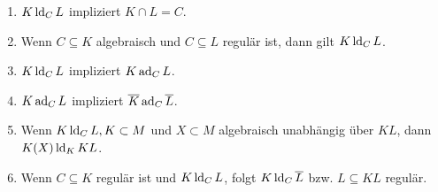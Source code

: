     \begin{lemma}\label{Rechenregeln}
    	\begin{enumerate}
    		\item $K\operatorname{ld}_CL$ impliziert $K\cap L=C$.
    		\item Wenn $C\subseteq K$ algebraisch und $C\subseteq L$ regulär ist, dann gilt $K\operatorname{ld}_CL$.
    		\item $K\operatorname{ld}_CL$ impliziert $K\operatorname{ad}_CL$.
    		\item $K\operatorname{ad}_CL$ impliziert $\overline{K}\operatorname{ad}_C\overline{L}$.
    		\item Wenn $K\operatorname{ld}_CL, K\subset M$ und $X\subset M$ algebraisch unabhängig über $KL$, dann $K(X)\operatorname{ld}_KKL$.
    		\item Wenn $C\subseteq K$ regulär ist und $K\operatorname{ld}_CL$, folgt $K\operatorname{ld}_C\overline{L}$ bzw. $L\subseteq KL$ regulär.
    	\end{enumerate}
    \end{lemma}
